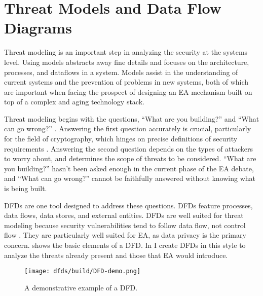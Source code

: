 


\section{Threat Models and Data Flow Diagrams}
\label{sec-threat-model-intro}

Threat modeling is an important step in analyzing the security at the systems level. Using models abstracts away fine
details and focuses on the architecture, processes, and dataflows in a system. Models assist in the understanding of
current systems and the prevention of problems in new systems, both of which are important when facing the prospect of
designing an \ac{EA} mechanism built on top of a complex and aging technology stack.

Threat modeling begins with the questions, ``What are you building?'' and ``What can go wrong?''
\cite{shostack_threat_2014}. Answering the first question accurately is crucial, particularly for the field of
cryptography, which hinges on precise definitions of security requirements \cite{varia_2018}. Answering the second
question depends on the types of attackers to worry about, and determines the scope of threats to be considered. ``What
are you building?'' hasn't been asked enough in the current phase of the \ac{EA} debate, and ``What can go wrong?''
cannot be faithfully answered without knowing what is being built.

\Acp{DFD} are one tool designed to address these questions. \Acp{DFD} feature processes, data flows, data stores, and
external entities. \Acp{DFD} are well suited for threat modeling because security vulnerabilities tend to follow data
flow, not control flow \cite{shostack_threat_2014}. They are particularly well suited for \ac{EA}, as data privacy is
the primary concern.  shows the basic elements of a \ac{DFD}. In  I create
\acp{DFD} in this style to analyze the threats already present and those that \ac{EA} would introduce.

\begin{figure}[ht]
    \centering\CaptionFontSize
    \texttt{[image: dfds/build/DFD-demo.png]}
    \caption[\Acs{DFD} Demo]{A demonstrative example of a \acf{DFD}.}
    \label{fig-dfd-demo}
\end{figure}
